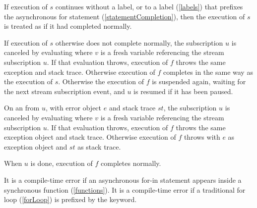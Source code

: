 \documentclass[makeidx]{article}
\begin{document}
{

\LMHash{}%
If execution of $s$ continues without a label,
or to a label (\ref{labels})
that prefixes the asynchronous for statement (\ref{statementCompletion}),
then the execution of $s$ is treated as if it had completed normally.

\LMHash{}%
If execution of $s$ otherwise does not complete normally,
the subscription $u$ is canceled by evaluating 
where $v$ is a fresh variable referencing the stream subscription $u$.
If that evaluation throws,
execution of $f$ throws the same exception and stack trace.
Otherwise execution of $f$ completes in the same way as the execution of $s$.
Otherwise the execution of $f$ is suspended again, waiting for
the next stream subscription event,
and $u$ is resumed if it has been paused.

\LMHash{}%
On an  from $u$,
with error object $e$ and stack trace $st$,
the subscription $u$ is canceled by evaluating 
where $v$ is a fresh variable referencing the stream subscription $u$.
If that evaluation throws,
execution of $f$ throws the same exception object and stack trace.
Otherwise execution of $f$ throws
with $e$ as exception object and $st$ as stack trace.

\LMHash{}%
When $u$ is done, execution of $f$ completes normally.

\LMHash{}%
It is a compile-time error if an asynchronous for-in statement appears
inside a synchronous function (\ref{functions}).
It is a compile-time error if a traditional for loop (\ref{forLoop}) is
prefixed by the \AWAIT{} keyword.



}
\end{document}
